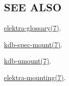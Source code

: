 \subsection*{S\+EE A\+L\+SO}


\begin{DoxyItemize}
\item \hyperlink{md_doc_help_elektra-glossary_doc_help_elektra-glossary_md}{elektra-\/glossary(7)}.
\item \hyperlink{md_doc_help_kdb-spec-mount_doc_help_kdb-spec-mount_md}{kdb-\/spec-\/mount(7)}.
\item \hyperlink{md_doc_help_kdb-umount_doc_help_kdb-umount_md}{kdb-\/umount(7)}.
\item \hyperlink{md_doc_help_elektra-mounting_doc_help_elektra-mounting_md}{elektra-\/mounting(7)}. 
\end{DoxyItemize}